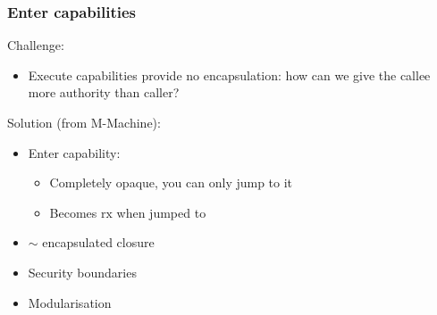 \documentclass{beamer}
\newcommand{\plainperm}[1]{\mathrm{#1}}
\newcommand{\exec}{\plainperm{rx}}
\begin{document}
\begin{frame}
  \frametitle{Enter capabilities}
  Challenge:
  \begin{itemize}
  \item Execute capabilities provide no encapsulation: how can we give the
    callee more authority than caller?
  \end{itemize}
  \pause
  Solution (from M-Machine):
  \begin{itemize}
  \item Enter capability:
    \begin{itemize}
    \item Completely opaque, you can only jump to it
    \item Becomes $\exec$ when jumped to
    \end{itemize}
  \item $\sim$ encapsulated closure
  \item Security boundaries
  \item Modularisation
  \end{itemize}
\end{frame}
\end{document}
